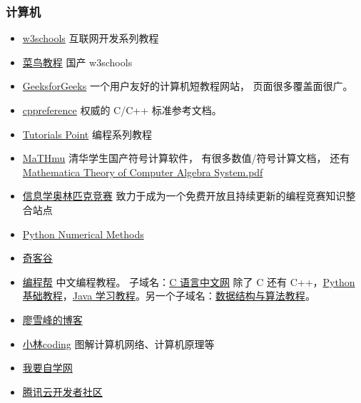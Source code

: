 \subsubsection{计算机}
\begin{itemize}
\item \href{https://www.w3schools.com}{w3schools} 互联网开发系列教程
\item \href{https://www.runoob.com/}{菜鸟教程} 国产 w3schools
\item \href{https://www.geeksforgeeks.org/}{GeeksforGeeks} 一个用户友好的计算机短教程网站， 页面很多覆盖面很广。
\item \href{https://cppreference.com}{cppreference} 权威的 C/C++ 标准参考文档。
\item \href{https://www.tutorialspoint.com/index.htm}{Tutorials Point} 编程系列教程
\item \href{http://mathmu.github.io/MTCAS/RecentChanges.html}{MaTHmu} 清华学生国产符号计算软件， 有很多数值/符号计算文档， 还有 \href{https://github.com/maTHmU/MTCAS}{Mathematica Theory of Computer Algebra System.pdf}
\item \href{https://oi-wiki.org}{信息学奥林匹克竞赛} 致力于成为一个免费开放且持续更新的编程竞赛知识整合站点
\item \href{https://pythonnumericalmethods.berkeley.edu/notebooks/Index.html}{Python Numerical Methods}
\item \href{https://www.qikegu.com}{奇客谷}
\item \href{http://www.biancheng.net/}{编程帮} 中文编程教程。 子域名：\href{http://c.biancheng.net}{C 语言中文网} 除了 C 还有 C++，\href{http://c.biancheng.net/python/}{Python 基础教程}，\href{http://c.biancheng.net/java/}{Java 学习教程}。另一个子域名：\href{http://data.biancheng.net/}{数据结构与算法教程}。
\item \href{https://www.liaoxuefeng.com}{廖雪峰的博客}
\item \href{https://xiaolincoding.com}{小林coding} 图解计算机网络、计算机原理等
\item \href{https://www.51zxw.net}{我要自学网}
\item \href{https://cloud.tencent.com/developer}{腾讯云开发者社区}
\end{itemize}

